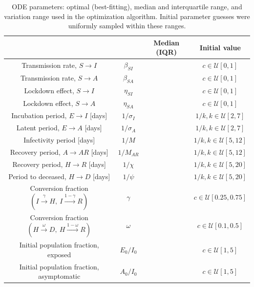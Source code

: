 \documentclass[11pt]{article}
\newcommand{\U}{\mathcal{U}}
\begin{document}
	\begin{table}[h]
		\centering
		\caption{ODE parameters: optimal (best-fitting), median and interquartile range, and variation range used in the optimization algorithm.
			Initial parameter guesses were uniformly sampled within these ranges.}
		\label{tab:parameters}
		\begin{tabular}{ c c c c }
			\hline
			\hline
																								&					&	Median (IQR)	&	Initial value \\
			\hline
			Transmission rate, $S \to I$							&	$\beta_{SI}$	&									&	$c \in \U [0,1]$ \\
			Transmission rate, $S \to A$							&	$\beta_{SA}$	&									& 	$c \in \U [0,1]$ \\
			Lockdown effect, $S \to I$															&	$\eta_{SI}$ 	&									& 	$c \in \U [0,1]$ \\
			Lockdown effect, $S \to A$															&	$\eta_{SA}$		&									& 	$c \in \U [0,1]$ \\
			Incubation period, $E \to I$ [days]													&	$1 / \sigma_I$	&									& 	$1 / k, k \in \U [2,7]$ \\
			Latent period, $E \to A$ [days]														&	$1 / \sigma_A$	&									& 	$1 / k, k \in \U [2,7]$ \\
			Infectivity period [days]															&	$1 / M$			&									& 	$1 / k, k \in \U [5,12]$ \\
			Recovery period, $A \to AR$ [days]													&	$1 / M_{AR}$	&									& 	$1 / k, k \in \U [5,12]$ \\
			Recovery period, $H \to R$ [days]													&	$1 / \chi$		&									& 	$1 / k, k \in \U [5,20]$ \\
			Period to deceased, $H \to D$ [days]												&	$1 / \psi$		&									& 	$1 / k, k \in \U [5,20]$ \\
			Conversion fraction $(I \xrightarrow{\gamma} H, \ I \xrightarrow{1 - \gamma} R)$	&	$\gamma$		&									& 	$c \in \U [0.25,0.75]$ \\
			Conversion fraction $(H \xrightarrow{\omega} D, \ H \xrightarrow{1 - \omega} R)$	&	$\omega$		&									& 	$c \in \U [0.1,0.5]$ \\
			Initial population fraction, exposed												&	$E_0 / I_0$		&									& 	$c \in \U [1,5]$ \\
			Initial population fraction, asymptomatic											&	$A_0 / I_0$		&									& 	$c \in \U [1,5]$ \\
			\hline
			\hline
		\end{tabular}
	\end{table}
\end{document}
